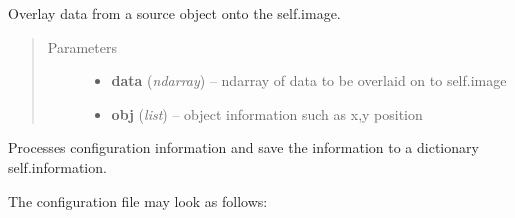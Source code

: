 \documentclass[a4paper,12pt,english]{sphinxmanual}
\begin{document}
\begin{fulllineitems}
\begin{fulllineitems}
\begin{quote}
\begin{description}
\end{description}\end{quote}

\end{fulllineitems}


\begin{fulllineitems}
\label{simulator:simulator.simulator.VISsimulator.overlayToCCD}
Overlay data from a source object onto the self.image.
\begin{quote}\begin{description}
\item[{Parameters}] \leavevmode\begin{itemize}
\item {} 
\textbf{data} (\emph{ndarray}) -- ndarray of data to be overlaid on to self.image

\item {} 
\textbf{obj} (\emph{list}) -- object information such as x,y position

\end{itemize}

\end{description}\end{quote}

\end{fulllineitems}


\begin{fulllineitems}
\label{simulator:simulator.simulator.VISsimulator.processConfigs}
Processes configuration information and save the information to a dictionary self.information.

The configuration file may look as follows:


\end{fulllineitems}
\end{fulllineitems}
\end{document}
